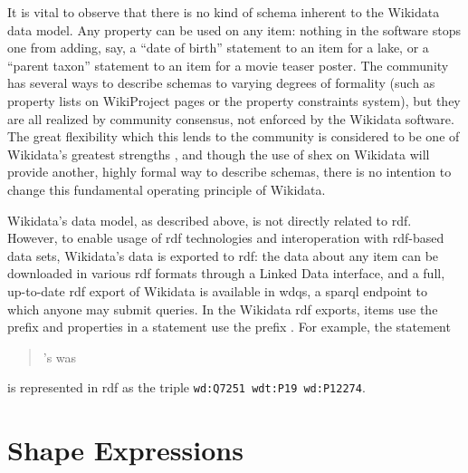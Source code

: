 It is vital to observe that there is no kind of \gls{schema} inherent to the \gls{Wikidata} data model.
Any \gls{property} can be used on any \gls{item}:
nothing in the software stops one from adding, say,
a “date of birth” \gls{statement} to an \gls{item} for a lake,
or a “parent taxon” \gls{statement} to an \gls{item} for a movie teaser poster.
The community has several ways to describe \glspl{schema} to varying degrees of formality
(such as \gls{property} lists on WikiProject pages or the property constraints system),
but they are all realized by community consensus,
not enforced by the \gls{Wikidata} software.
The great flexibility which this lends to the community
is considered to be one of \gls{Wikidata}’s greatest strengths \cite{vrandecic-restricting-the-world},
and though the use of \gls{shex}
on \gls{Wikidata} will provide another,
highly formal way to describe \glspl{schema},
there is no intention to change this fundamental operating principle of \gls{Wikidata}.

\Gls{Wikidata}’s data model, as described above,
is not directly related to \gls{rdf}.
However, to enable usage of \gls{rdf} technologies and interoperation with \gls{rdf}-based data sets,
\gls{Wikidata}’s data is exported to \gls{rdf}:
the data about any \gls{item} can be downloaded in various \gls{rdf} formats through a \gls{Linked Data} interface,
and a full, up-to-date \gls{rdf} export of \gls{Wikidata} is available in \gls{wdqs},
a \gls{sparql} endpoint to which anyone may submit queries.
In the \gls{Wikidata} \gls{rdf} exports,
items use the \gls{prefix}  and properties in a statement use the \gls{prefix} .
For example, the statement
\begin{quotation}
  ’s  was 
\end{quotation}
is represented in \gls{rdf} as the \gls{triple} \lstinline[language=sparql]{wd:Q7251 wdt:P19 wd:P12274}.


\section{Shape Expressions}
\label{sec:Background:ShEx}


